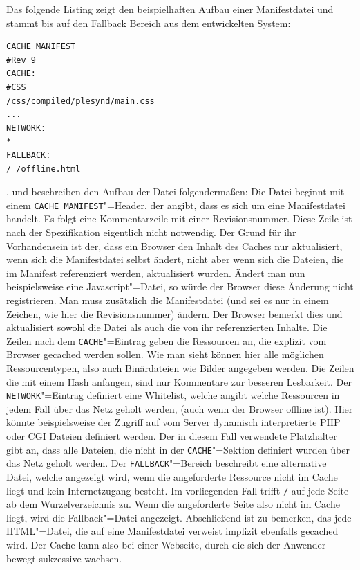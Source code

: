 Das folgende Listing zeigt den beispielhaften Aufbau einer Manifestdatei und stammt bis auf den Fallback Bereich aus dem entwickelten System:
\begin{lstlisting}
CACHE MANIFEST
#Rev 9
CACHE:
#CSS
/css/compiled/plesynd/main.css
...
NETWORK:
*
FALLBACK:
/ /offline.html
\end{lstlisting}

\cite{W3C2012}, \cite{html5upandrunningchapter8} und \cite{Bidelman2010} beschreiben den Aufbau der Datei folgendermaßen: Die Datei beginnt mit einem \texttt{CACHE MANIFEST}"=Header, der angibt, dass es sich um eine Manifestdatei handelt. Es folgt eine Kommentarzeile mit einer Revisionsnummer. Diese Zeile ist nach der Spezifikation eigentlich nicht notwendig. Der Grund für ihr Vorhandensein ist der, dass ein Browser den Inhalt des Caches nur aktualisiert, wenn sich die Manifestdatei selbst ändert, nicht aber wenn sich die Dateien, die im Manifest referenziert werden, aktualisiert wurden. Ändert man nun beispielsweise eine Javascript"=Datei, so würde der Browser diese Änderung nicht registrieren. Man muss zusätzlich die Manifestdatei (und sei es nur in einem Zeichen, wie hier die Revisionsnummer) ändern. Der Browser bemerkt dies und aktualisiert sowohl die Datei als auch die von ihr referenzierten Inhalte. Die Zeilen nach dem \texttt{CACHE}"=Eintrag geben die Ressourcen an, die explizit vom Browser gecached werden sollen. Wie man sieht können hier alle möglichen Ressourcentypen, also auch Binärdateien wie Bilder angegeben werden. Die Zeilen die mit einem Hash anfangen, sind nur Kommentare zur besseren Lesbarkeit. Der \texttt{NETWORK}"=Eintrag definiert eine Whitelist, welche angibt welche Ressourcen in jedem Fall über das Netz geholt werden, (auch wenn der Browser offline ist). Hier könnte beispielsweise der Zugriff auf vom Server dynamisch interpretierte PHP oder CGI Dateien definiert werden. Der in diesem Fall verwendete Platzhalter gibt an, dass alle Dateien, die nicht in der \texttt{CACHE}"=Sektion definiert wurden über das Netz geholt werden. Der \texttt{FALLBACK}"=Bereich beschreibt eine alternative Datei, welche angezeigt wird, wenn die angeforderte Ressource nicht im Cache liegt und kein Internetzugang besteht. Im vorliegenden Fall trifft \texttt{/} auf jede Seite ab dem Wurzelverzeichnis zu. Wenn die angeforderte Seite also nicht im Cache liegt, wird die Fallback"=Datei angezeigt. Abschließend ist zu bemerken, das jede HTML"=Datei, die auf eine Manifestdatei verweist implizit ebenfalls gecached wird. Der Cache kann also bei einer Webseite, durch die sich der Anwender bewegt sukzessive wachsen.

